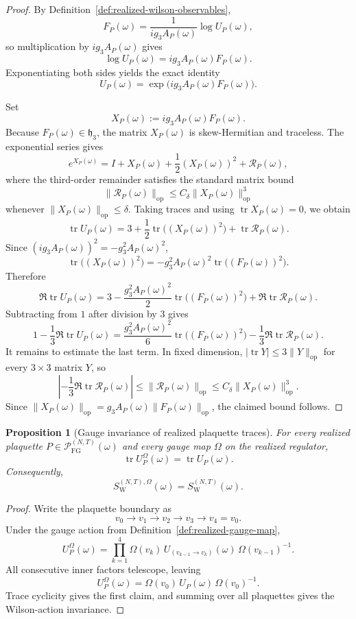 \documentclass[11pt]{article}
\newtheorem{proposition}[theorem]{Proposition}
\theoremstyle{definition}
\theoremstyle{remark}
\newcommand{\mcP}{\mathcal P}
\newcommand{\tr}{\operatorname{tr}}
\newcommand{\mathfrakh}{\mathfrak h_3}
\begin{document}
\begin{proof}
By Definition~\ref{def:realized-wilson-observables},
\[
F_P(\omega)
=
\frac{1}{ig_3A_P(\omega)}\log U_P(\omega),
\]
so multiplication by \(ig_3A_P(\omega)\) gives
\[
\log U_P(\omega)=ig_3A_P(\omega)F_P(\omega).
\]
Exponentiating both sides yields the exact identity
\[
U_P(\omega)=\exp\!\bigl(i g_3 A_P(\omega)F_P(\omega)\bigr).
\]

Set
\[
X_P(\omega):=ig_3A_P(\omega)F_P(\omega).
\]
Because \(F_P(\omega)\in\mathfrakh\), the matrix \(X_P(\omega)\) is skew-Hermitian and
traceless.
The exponential series gives
\[
e^{X_P(\omega)}
=
I+X_P(\omega)+\frac12(X_P(\omega))^2+\mathcal R_P(\omega),
\]
where the third-order remainder satisfies the standard matrix bound
\[
\|\mathcal R_P(\omega)\|_{\mathrm{op}}
\le
C_\delta\|X_P(\omega)\|_{\mathrm{op}}^3
\]
whenever \(\|X_P(\omega)\|_{\mathrm{op}}\le\delta\).
Taking traces and using \(\tr X_P(\omega)=0\), we obtain
\[
\tr U_P(\omega)
=
3+\frac12\tr\!\bigl((X_P(\omega))^2\bigr)+\tr\mathcal R_P(\omega).
\]
Since \((ig_3A_P(\omega))^2=-g_3^2A_P(\omega)^2\),
\[
\tr\!\bigl((X_P(\omega))^2\bigr)
=
-g_3^2A_P(\omega)^2\tr\!\bigl((F_P(\omega))^2\bigr).
\]
Therefore
\[
\Re\tr U_P(\omega)
=
3-\frac{g_3^2A_P(\omega)^2}{2}\tr\!\bigl((F_P(\omega))^2\bigr)
+\Re\tr\mathcal R_P(\omega).
\]
Subtracting from $1$ after division by $3$ gives
\[
1-\frac13\Re\tr U_P(\omega)
=
\frac{g_3^2A_P(\omega)^2}{6}\tr\!\bigl((F_P(\omega))^2\bigr)
-\frac13\Re\tr\mathcal R_P(\omega).
\]
It remains to estimate the last term.
In fixed dimension, $|\tr Y|\le 3\|Y\|_{\mathrm{op}}$ for every
$3\times3$ matrix $Y$, so
\[
\left|-\frac13\Re\tr\mathcal R_P(\omega)\right|
\le
\|\mathcal R_P(\omega)\|_{\mathrm{op}}
\le
C_\delta\|X_P(\omega)\|_{\mathrm{op}}^3.
\]
Since \(\|X_P(\omega)\|_{\mathrm{op}}=g_3A_P(\omega)\|F_P(\omega)\|_{\mathrm{op}}\),
the claimed bound follows.
\end{proof}

\begin{proposition}[Gauge invariance of realized plaquette traces]
\label{prop:realized-gauge-invariance}
For every realized plaquette \(P\in\mcP_{\mathrm{FG}}^{(N,T)}(\omega)\) and
every gauge map \(\Omega\) on the realized regulator,
\[
\tr U_P^\Omega(\omega)=\tr U_P(\omega).
\]
Consequently,
\[
S_{\mathrm W}^{(N,T),\Omega}(\omega)=S_{\mathrm W}^{(N,T)}(\omega).
\]
\end{proposition}

\begin{proof}
Write the plaquette boundary as
\[
v_0\to v_1\to v_2\to v_3\to v_4=v_0.
\]
Under the gauge action from Definition~\ref{def:realized-gauge-map},
\[
U_P^\Omega(\omega)
=
\prod_{k=1}^4
\Omega(v_k)\,U_{(v_{k-1}\to v_k)}(\omega)\,\Omega(v_{k-1})^{-1}.
\]
All consecutive inner factors telescope, leaving
\[
U_P^\Omega(\omega)
=
\Omega(v_0)\,U_P(\omega)\,\Omega(v_0)^{-1}.
\]
Trace cyclicity gives the first claim, and summing over all plaquettes gives
the Wilson-action invariance.
\end{proof}
\end{document}
